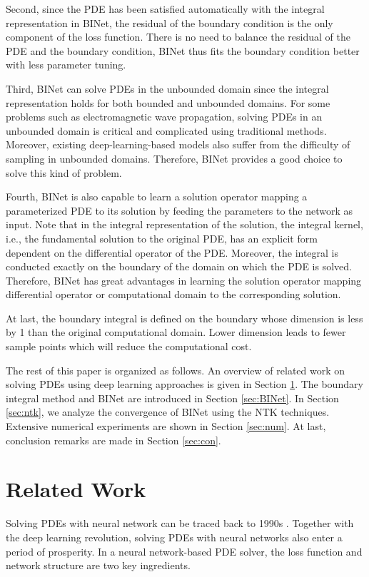 \documentclass[hyperref]{article}
\numberwithin{equation}{section}
\theoremstyle{nonumberplain}
\begin{document}
	
	
	Second, since the PDE has been satisfied automatically with the integral representation in BINet, the residual of the boundary condition is the only component of the loss function. There is no need to balance the residual of the PDE and the boundary condition, BINet thus fits the boundary condition better with less parameter tuning.
	
	
	Third, BINet can solve PDEs in the unbounded domain since the integral representation holds for both bounded and unbounded domains. For some problems such as electromagnetic wave propagation, solving PDEs in an unbounded domain is critical and complicated using traditional methods. Moreover, existing deep-learning-based models also suffer from the difficulty of sampling in unbounded domains. Therefore, BINet provides a good choice to solve this kind of problem.
	
	
	
	Fourth, BINet is also capable to learn a solution operator mapping a parameterized PDE to its solution by feeding the parameters to the network as input. Note that in the integral representation of the solution, the integral kernel, i.e., the fundamental solution to the original PDE, has an explicit form dependent on the differential operator of the PDE. Moreover, the integral is conducted exactly on the boundary of the domain on which the PDE is solved. Therefore, BINet has great advantages in learning the solution operator mapping differential operator or computational domain to the corresponding solution.
	
	At last, the boundary integral is defined on the boundary whose dimension is less by 1 than the original computational domain. Lower dimension leads to fewer sample points which will reduce the computational cost.
	
	The rest of this paper is organized as follows.  An overview of related work on solving PDEs using deep learning approaches is given in Section \ref{sec:rel}. The boundary integral method and BINet are introduced in Section \ref{sec:BINet}. In Section \ref{sec:ntk}, we analyze the convergence of BINet using the NTK techniques. Extensive numerical experiments are shown in Section \ref{sec:num}. At last, conclusion remarks are made in Section \ref{sec:con}.
	
	
	
	
	
	
	
	
	
	
	\section{Related Work}\label{sec:rel}
	Solving PDEs with neural network can be traced back to 1990s \cite{dissanayake1994neural, lagaris1998artificial,lagaris2000neural}.
	Together with the deep learning revolution, solving PDEs with neural networks also enter a period of prosperity. In a neural network-based PDE solver, the loss function and network structure are two key ingredients. 
	
\end{document}
